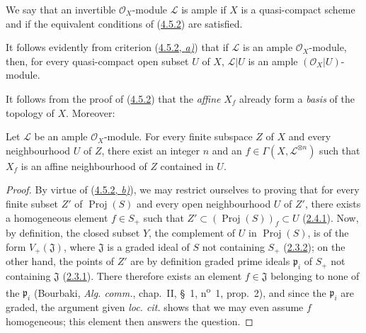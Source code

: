 \begin{definition}[4.5.3]
\label{II.4.5.3}
We say that an invertible $\mathcal{O}_X$-module $\mathcal{L}$ is \textup{ample} if
$X$ is a quasi-compact scheme and if the equivalent conditions of
(\hyperref[II.4.5.2]{4.5.2}) are satisfied.
\end{definition}

It follows evidently from criterion (\hyperref[II.4.5.2]{4.5.2, \emph{a)}}) that if
$\mathcal{L}$ is an ample $\mathcal{O}_X$-module, then, for every quasi-compact open subset
$U$ of $X$, $\mathcal{L}|U$ is an ample $(\mathcal{O}_X|U)$-module.

It follows from the proof of (\hyperref[II.4.5.2]{4.5.2}) that the
\emph{affine} $X_f$ already form a \emph{basis} of the topology of $X$. Moreover:

\begin{corollary}[4.5.4]
\label{II.4.5.4}
Let $\mathcal{L}$ be an ample $\mathcal{O}_X$-module. For every finite subspace
$Z$ of $X$ and every neighbourhood $U$ of $Z$, there exist an integer $n$ and an
$f\in\Gamma(X,\mathcal{L}^{\otimes n})$ such that $X_f$ is an affine
neighbourhood of $Z$ contained in $U$.
\end{corollary}

\begin{proof}

By virtue of (\hyperref[II.4.5.2]{4.5.2, \emph{b)}}), we may restrict ourselves to proving
that for every finite subset $Z'$ of $\operatorname{Proj}(S)$ and every
open neighbourhood $U$ of $Z'$, there exists a homogeneous element $f\in S_+$ such
that $Z'\subset(\operatorname{Proj}(S))_f\subset U$
(\hyperref[II.2.4.1]{2.4.1}). Now, by definition, the closed subset $Y$,
the complement of $U$ in $\operatorname{Proj}(S)$, is of the form
$V_+(\mathfrak{J})$, where $\mathfrak{J}$ is a graded ideal of $S$ not
containing $S_+$ (\hyperref[II.2.3.2]{2.3.2}); on the other hand, the
points of $Z'$ are by definition graded prime ideals
$\mathfrak{p}_i$ of $S_+$ not containing $\mathfrak{J}$
(\hyperref[II.2.3.1]{2.3.1}). There therefore exists an element
$f\in\mathfrak{J}$ belonging to none of the $\mathfrak{p}_i$ (Bourbaki,
\emph{Alg. comm.}, chap.~II, \S~1, n\textsuperscript{o}~1, prop.~2), and since
the $\mathfrak{p}_i$ are graded, the argument given \emph{loc. cit.}
shows that we may even assume $f$ homogeneous; this element then answers the
question.
\end{proof}

